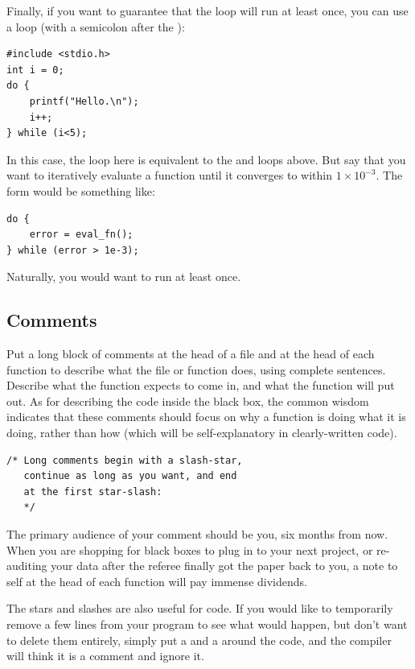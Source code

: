 Finally, if you want to guarantee that the loop will run at least once, you can use a  loop (with a semicolon after the ):

\begin{lstlisting}
#include <stdio.h>
int i = 0;
do {
    printf("Hello.\n");
    i++;
} while (i<5);
\end{lstlisting}
In this case, the  loop here is equivalent to the
 and  loops above. But say that you want to
iteratively evaluate a function until it converges to within $1\times
10^{-3}$.  The form would be something like:
\begin{lstlisting}
do {
    error = eval_fn();
} while (error > 1e-3);
\end{lstlisting}
Naturally, you would want to run  at least once.

\subsection{Comments} 
Put a long block of comments 
at the head of a file and at the head of each function to describe what
the file or function does, using complete sentences. Describe what the
function expects to come in, and what the function will put out.
As for describing the code inside the black box, the common wisdom
indicates that these comments should focus on why a function is doing what it is doing,
rather than how (which will be self-explanatory in clearly-written code).
\begin{verbatim}
/* Long comments begin with a slash-star,
   continue as long as you want, and end 
   at the first star-slash:   
   */
\end{verbatim}

The primary audience of your comment should be you, six months from
now. When you are shopping for black boxes to plug in to your next project,
or re-auditing your data after the referee finally got the paper back
to you, a note to self at the head of each function will pay immense
dividends. 


The stars and slashes are also useful for  code. If
you would like to temporarily remove a few lines from your program to
see what would happen, but don't want to delete them entirely, simply
put a \ci{/*} and a \ci{*/} around the code, and the compiler will think
it is a comment and ignore it.

